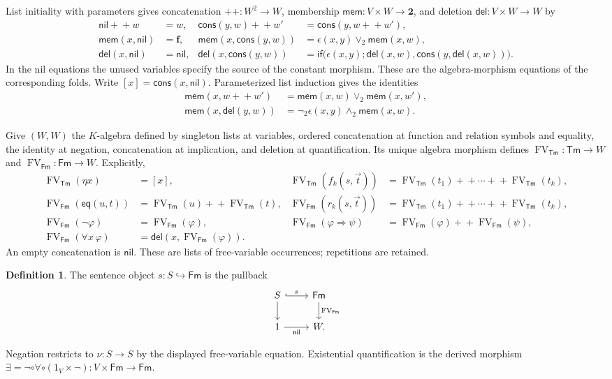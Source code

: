 \documentclass[11pt]{article}
\theoremstyle{definition}\newtheorem{definition}[theorem]{Definition}
\newcommand{\Tm}{\mathsf{Tm}}
\newcommand{\Fm}{\mathsf{Fm}}
\newcommand{\FV}{\operatorname{FV}}
\newcommand{\Two}{\mathbf 2}
\newcommand{\nil}{\mathsf{nil}}
\newcommand{\cons}{\mathsf{cons}}
\newcommand{\mem}{\mathsf{mem}}
\newcommand{\del}{\mathsf{del}}
\begin{document}
List initiality with parameters gives concatenation
$+\!+:W^2\to W$, membership $\mem:V\times W\to\Two$, and
deletion $\del:V\times W\to W$ by
\begin{align*}
 \nil+\!+w&=w,&
 \cons(y,w)+\!+w'&=\cons(y,w+\!+w'),\\
 \mem(x,\nil)&=\mathbf f,&
 \mem(x,\cons(y,w))&=\epsilon(x,y)\vee_2\mem(x,w),\\
 \del(x,\nil)&=\nil,&
 \del(x,\cons(y,w))&=
 \mathsf{if}\bigl(\epsilon(x,y);\del(x,w),
                         \cons(y,\del(x,w))\bigr).
\end{align*}
In the nil equations the unused variables specify the source of the
constant morphism. These are the algebra-morphism equations of the
corresponding folds. Write $[x]=\cons(x,\nil)$.
Parameterized list induction gives the identities
\begin{align*}
 \mem(x,w+\!+w')&=\mem(x,w)\vee_2\mem(x,w'),\\
 \mem(x,\del(y,w))&=\neg_2\epsilon(x,y)\wedge_2\mem(x,w).
\end{align*}

Give $(W,W)$ the $K$-algebra defined by singleton lists at variables,
ordered concatenation at function and relation symbols and equality,
the identity at negation, concatenation at implication, and deletion
at quantification. Its unique algebra morphism defines
$\FV_{\Tm}:\Tm\to W$ and $\FV_{\Fm}:\Fm\to W$. Explicitly,
\begin{align*}
 \FV_{\Tm}(\eta x)&=[x],&
 \FV_{\Tm}(f_k(s,\vec t))&=\FV_{\Tm}(t_1)+\!+\cdots+\!+\FV_{\Tm}(t_k),\\
 \FV_{\Fm}(\mathsf{eq}(u,t))&=\FV_{\Tm}(u)+\!+\FV_{\Tm}(t),&
 \FV_{\Fm}(r_k(s,\vec t))&=\FV_{\Tm}(t_1)+\!+\cdots+\!+\FV_{\Tm}(t_k),\\
 \FV_{\Fm}(\neg\varphi)&=\FV_{\Fm}(\varphi),&
 \FV_{\Fm}(\varphi\Rightarrow\psi)&=\FV_{\Fm}(\varphi)+\!+\FV_{\Fm}(\psi),\\
 \FV_{\Fm}(\forall x\,\varphi)&=\del(x,\FV_{\Fm}(\varphi)).&&
\end{align*}
An empty concatenation is $\nil$. These are lists of free-variable
occurrences; repetitions are retained.

\begin{definition}\label{def:sentence-object}
The sentence object $s:S\hookrightarrow\Fm$ is the pullback
\[
\begin{tikzcd}
 S\arrow[r,hook,"s"]\arrow[d] & \Fm\arrow[d,"\FV_{\Fm}"]\\
 1\arrow[r,"\nil"'] & W.
\end{tikzcd}
\]
\end{definition}
Negation restricts to $\nu:S\to S$ by the displayed free-variable
equation. Existential quantification is the derived morphism
$\exists=\neg\circ\forall\circ(1_V\times\neg):V\times\Fm\to\Fm$.
\end{document}
